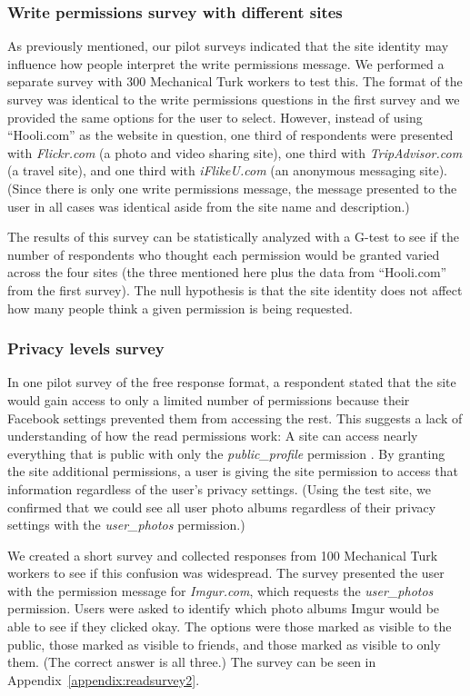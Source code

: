 \documentclass[10pt]{sig-alternate-10pt}
\begin{document}
\subsubsection{Write permissions survey with different sites}
\label{sec:multisite}

As previously mentioned, our pilot surveys indicated that the site identity may influence how people interpret the write permissions message. We performed a separate survey with 300 Mechanical Turk workers to test this. The format of the survey was identical to the write permissions questions in the first survey and we provided the same options for the user to select. However, instead of using ``Hooli.com'' as the website in question, one third of respondents were presented with \emph{Flickr.com} (a photo and video sharing site), one third with \emph{TripAdvisor.com} (a travel site), and one third with \emph{iFlikeU.com} (an anonymous messaging site). (Since there is only one write permissions message, the message presented to the user in all cases was identical aside from the site name and description.)

The results of this survey can be statistically analyzed with a G-test to see if the number of respondents who thought each permission would be granted varied across the four sites (the three mentioned here plus the data from ``Hooli.com'' from the first survey). The null hypothesis is that the site identity does not affect how many people think a given permission is being requested.

\subsubsection{Privacy levels survey}
\label{sec:privacysurvey}

In one pilot survey of the free response format, a respondent stated that the site would gain access to only a limited number of permissions because their Facebook settings prevented them from accessing the rest. This suggests a lack of understanding of how the read permissions work: A site can access nearly everything that is public with only the \emph{public\_profile} permission \cite{fbprivacyfaq}. By granting the site additional permissions, a user is giving the site permission to access that information regardless of the user's privacy settings. (Using the test site, we confirmed that we could see all user photo albums regardless of their privacy settings with the \emph{user\_photos} permission.)

We created a short survey and collected responses from 100 Mechanical Turk workers to see if this confusion was widespread. The survey presented the user with the permission message for \emph{Imgur.com}, which requests the \emph{user\_photos} permission. Users were asked to identify which photo albums Imgur would be able to see if they clicked okay. The options were those marked as visible to the public, those marked as visible to friends, and those marked as visible to only them. (The correct answer is all three.) The survey can be seen in Appendix~\ref{appendix:readsurvey2}.
\end{document}
